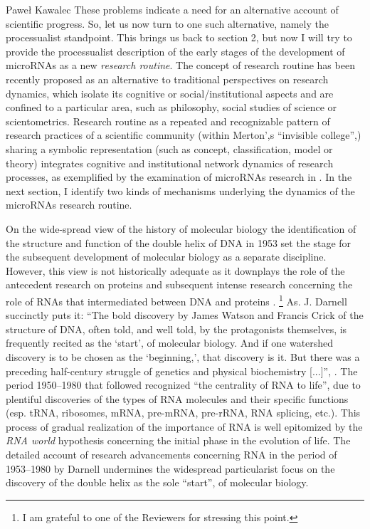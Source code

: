 \begin{artengenv}{Paweł Kawalec}
These problems indicate a need for an alternative account of scientific progress. So, let us now turn to one such alternative, namely the processualist standpoint. This brings us back to section 2, but now I will try to provide the processualist description of the early stages of the development of microRNAs as a new \textit{research routine}. The concept of research routine has been recently proposed as an alternative to traditional perspectives on research dynamics, which isolate its cognitive or social/institutional aspects and are confined to a particular area, such as philosophy, social studies of science or scientometrics. Research routine as a repeated and recognizable pattern of research practices of a scientific community (within Merton',s ``invisible college'',) sharing a symbolic representation (such as concept, classification, model or theory) integrates cognitive and institutional network dynamics of research processes, as exemplified by the examination of microRNAs research in
\parencite[][]{kawalec_transformations_2018}. %
 In the next section, I identify two kinds of mechanisms underlying the dynamics of the microRNAs research routine.

On the wide-spread view of the history of molecular biology the identification of the structure and function of the double helix of DNA in 1953 set the stage for the subsequent development of molecular biology as a separate discipline. However, this view is not historically adequate as it downplays the role of the antecedent research on proteins and subsequent intense research concerning the role of RNAs that intermediated between DNA and proteins
\parencite[][]{garcia-sancho_biology_2012}.%
\footnote{I am grateful to one of the Reviewers for stressing this point.} As. J. Darnell succinctly puts it: ``The bold discovery by James Watson and Francis Crick of the structure of DNA, often told, and well told, by the protagonists themselves, is frequently recited as the ‘start', of molecular biology. And if one watershed discovery is to be chosen as the ‘beginning,', that discovery is it. But there was a preceding half-century struggle of genetics and physical biochemistry [...]'', 
\parencite[][p.2]{darnell_rna_2011}. %
 The period 1950–1980 that followed recognized ``the centrality of RNA to life'', due to plentiful discoveries of the types of RNA molecules and their specific functions (esp. tRNA, ribosomes, mRNA, pre-mRNA, pre-rRNA, RNA splicing, etc.). This process of gradual realization of the importance of RNA is well epitomized by the \textit{RNA world} hypothesis concerning the initial phase in the evolution of life. The detailed account of research advancements concerning RNA in the period of 1953–1980 by Darnell 
\parencite*[][]{darnell_rna_2011} %
 undermines the widespread particularist focus on the discovery of the double helix as the sole ``start'', of molecular biology.


\end{artengenv}
